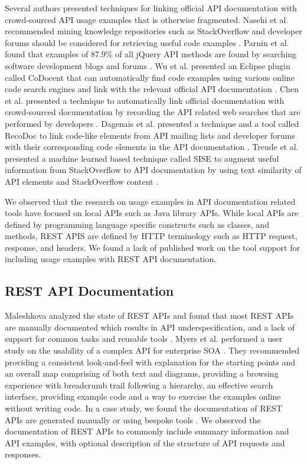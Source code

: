 \documentclass[10pt, conference]{IEEEtran}
\begin{document}
Several authors presented techniques for linking official API documentation with crowd-sourced API usage examples that is otherwise fragmented. Nasehi et al. recommended mining knowledge repositories such as StackOverflow and developer forums should be considered for retrieving useful code examples \cite{Nasehi_what_makes}. Parnin et al. found that examples of 87.9\% of all jQuery API methods are found by searching software development blogs and forums \cite{Parnin_measuring}. Wu et al. presented an Eclipse plugin called CoDocent that can automatically find code examples using various online code search engines and link with the relevant official API documentation \cite{wu2010codocent}. Chen et al. presented a technique to automatically link official documentation with crowd-sourced documentation by recording the API related web searches that are performed by developers \cite{Chen_who_asked}. Dagenais et al. presented a technique and a tool called RecoDoc to link code-like elements from API mailing lists and developer forums with their corresponding code elements in the API documentation \cite{dagenais2012recovering}. Treude et al. presented a machine learned based technique called SISE to augment useful information from StackOverflow to API documentation by using text similarity of API elements and StackOverflow content \cite{Treude:2016:AAD:2884781.2884800}.

We observed that the research on usage examples in API documentation related tools have focused on local APIs such as Java library APIs. While local APIs are defined by programming language specific constructs such as classes, and methods, REST APIS are defined by HTTP terminology such as HTTP request, response, and headers. We found a lack of published work on the tool support for including usage examples with REST API documentation.

\subsection{REST API Documentation} %
Maleshkova analyzed the state of REST APIs and found that most REST APIs are manually documented which results in API underspecification, and a lack of support for common tasks and reusable tools \cite{Maleshkova_investigating}. Myers et al. performed a user study on the usability of a complex API for enterprise SOA \cite{Myers_study}. They recommended providing a consistent look-and-feel with explanation for the starting points and an overall map comprising of both text and diagrams, providing a browsing experience with breadcrumb trail following a hierarchy, an effective search interface, providing example code and a way to exercise the examples online without writing code. In a case study, we found the documentation of REST APIs are generated manually or using bespoke tools \cite{sohan2015case}. We observed the documentation of REST APIs to commonly include summary information and API examples, with optional description of the structure of API requests and responses.
\end{document}
